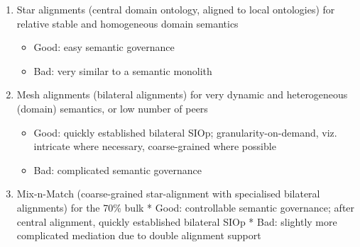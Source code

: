 \documentclass[a4paper,11pt,oneside,oldfontcommands]{memoir}
\theoremstyle{definition}
\theoremstyle{break}		%
\numberwithin{equation}{chapter}
\numberwithin{figure}{chapter}
\begin{document}
\begin{enumerate}
\def\labelenumi{\roman{enumi}.}
\tightlist
\item
  Star alignments (central domain ontology, aligned to local ontologies)
  for relative stable and homogeneous domain semantics

  \begin{itemize}
  \tightlist
  \item
    Good: easy semantic governance
  \item
    Bad: very similar to a semantic monolith
  \end{itemize}
\item
  Mesh alignments (bilateral alignments) for very dynamic and
  heterogeneous (domain) semantics, or low number of peers

  \begin{itemize}
  \tightlist
  \item
    Good: quickly established bilateral SIOp; granularity-on-demand,
    viz. intricate where necessary, coarse-grained where possible
  \item
    Bad: complicated semantic governance
  \end{itemize}
\item
  Mix-n-Match (coarse-grained star-alignment with specialised bilateral
  alignments) for the 70\% bulk * Good: controllable semantic
  governance; after central alignment, quickly established bilateral
  SIOp * Bad: slightly more complicated mediation due to double
  alignment support
\end{enumerate}
\end{document}
